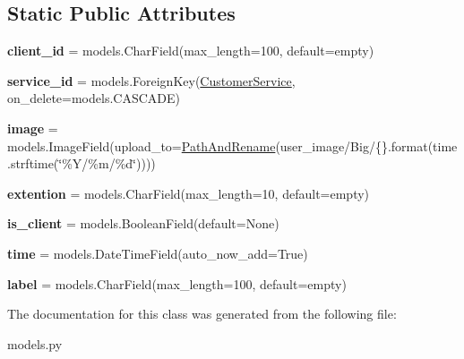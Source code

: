 \subsection*{Static Public Attributes}
\begin{DoxyCompactItemize}
\item 
\mbox{\label{classbackend_1_1models_1_1_big_image_log_a84cf9905ea9190192e7eaa2feb32416d}} 
{\bfseries client\+\_\+id} = models.\+Char\+Field(max\+\_\+length=100, default=\textquotesingle{}empty\textquotesingle{})
\item 
\mbox{\label{classbackend_1_1models_1_1_big_image_log_a63ca14bb098d823eeb1597fce63bca91}} 
{\bfseries service\+\_\+id} = models.\+Foreign\+Key(\textquotesingle{}\hyperlink{classbackend_1_1models_1_1_customer_service}{Customer\+Service}\textquotesingle{}, on\+\_\+delete=models.\+C\+A\+S\+C\+A\+DE)
\item 
\mbox{\label{classbackend_1_1models_1_1_big_image_log_a4535ed035d68e05dd7768a295ffc5e93}} 
{\bfseries image} = models.\+Image\+Field(upload\+\_\+to=\hyperlink{classbackend_1_1models__helper__functions_1_1_path_and_rename}{Path\+And\+Rename}(\textquotesingle{}user\+\_\+image/Big/\{\}\textquotesingle{}.format(time.\+strftime(\char`\"{}\%Y/\%m/\%d\char`\"{}))))
\item 
\mbox{\label{classbackend_1_1models_1_1_big_image_log_a8f28bdaa98cdef21766ff16f4a52fedb}} 
{\bfseries extention} = models.\+Char\+Field(max\+\_\+length=10, default=\textquotesingle{}empty\textquotesingle{})
\item 
\mbox{\label{classbackend_1_1models_1_1_big_image_log_a97e841f8fb35c4281345dc5a0cb475f2}} 
{\bfseries is\+\_\+client} = models.\+Boolean\+Field(default=None)
\item 
\mbox{\label{classbackend_1_1models_1_1_big_image_log_ad4c7330e9571492474e8c86af78e672e}} 
{\bfseries time} = models.\+Date\+Time\+Field(auto\+\_\+now\+\_\+add=True)
\item 
\mbox{\label{classbackend_1_1models_1_1_big_image_log_ac44715f5cf49c20c3b882cbff0c6cbf1}} 
{\bfseries label} = models.\+Char\+Field(max\+\_\+length=100, default=\textquotesingle{}empty\textquotesingle{})
\end{DoxyCompactItemize}


The documentation for this class was generated from the following file\+:\begin{DoxyCompactItemize}
\item 
models.\+py\end{DoxyCompactItemize}
